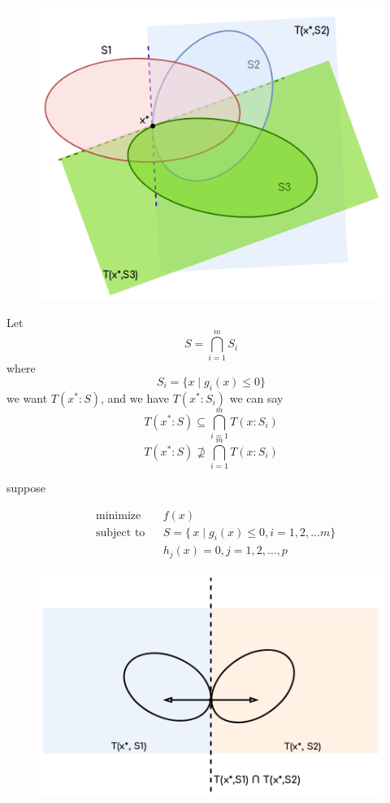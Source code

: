 \documentclass[twoside]{article}
\DeclareMathOperator{\minimize}{minimize}
\DeclareMathOperator{\subjectto}{subject\ to}
\begin{document}
\begin{figure}[h]
\center
\includegraphics[scale=0.25]{images/pic5.png}
\end{figure}
Let $$S = \bigcap^{m}_{i=1}S_i$$ where $$S_i = \{ x\mid g_i(x)\leq 0\}$$
we want $T(x^*:S)$, and we have $T(x^*:S_i)$
we can say $$T(x^*:S) \subseteq \bigcap_{i=1}^{m}T(x:S_i)$$
$$T(x^*:S)\nsupseteq \bigcap_{i=1}^{m}T(x:S_i)$$

suppose 


\begin{equation}
\begin{aligned}
& \minimize && f(x)\\
& \subjectto && S = \{\,x\mid g_{i}(x)\leq 0 , i = 1,2,...m\}\\
&&& h_j(x) = 0, j = 1,2, \ldots, p
\end{aligned}
\end{equation}

\begin{figure}[h]
\center
\includegraphics[scale=0.25]{images/pic6.png}
\end{figure}
\end{document}
